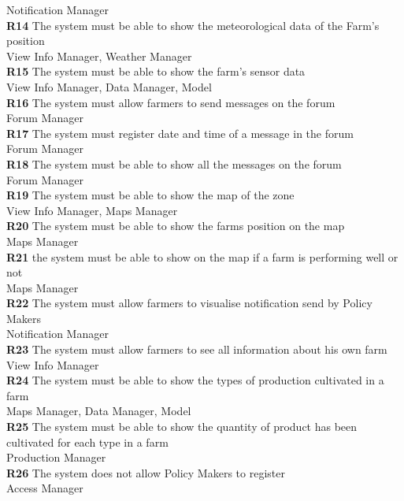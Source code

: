 \indent Notification Manager\\
\textbf{R14} The system must be able to show the meteorological data of the Farm’s position\\
\indent View Info Manager, Weather Manager\\
\textbf{R15} The system must be able to show the farm’s sensor data \\
\indent View Info Manager, Data Manager, Model\\
\textbf{R16} The system must allow farmers to send messages on the forum\\
\indent Forum Manager\\
\textbf{R17} The system must register date and time of a message in the forum\\
\indent Forum Manager\\
\textbf{R18} The system must be able to show all the messages on the forum\\
\indent Forum Manager\\
\textbf{R19} The system must be able to show the map of the zone\\
\indent View Info Manager, Maps Manager\\
\textbf{R20} The system must be able to show the farms position on the map\\
\indent Maps Manager\\
\textbf{R21} the system must be able to show on the map if a farm is performing well or not \\
\indent Maps Manager\\
\textbf{R22} The system must allow farmers to visualise notification send by Policy Makers\\
\indent Notification Manager\\
\textbf{R23} The system must allow farmers to see all information about his own farm\\
\indent View Info Manager\\
\textbf{R24} The system must be able to show the types of production cultivated in a farm\\
\indent Maps Manager, Data Manager, Model\\
\textbf{R25} The system must be able to show the quantity of product has been cultivated for each type in a farm\\
\indent Production Manager\\
\textbf{R26} The system does not allow Policy Makers to register\\
\indent Access Manager\\

